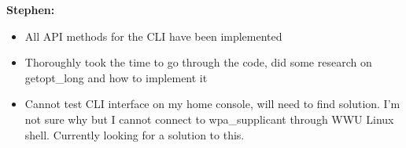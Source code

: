 \documentclass[11pt]{article}
\begin{document}
\textbf{Stephen:}
\begin{itemize}
  \item All API methods for the CLI have been implemented 
  \item Thoroughly took the time to go through the code, did some research on getopt_long
	and how to implement it
  \item Cannot test CLI interface on my home console, will need to find solution. I'm not 
	sure why but I cannot connect to wpa_supplicant through WWU Linux shell. Currently 
	looking for a solution to this. 
\end{itemize}
\end{document}
